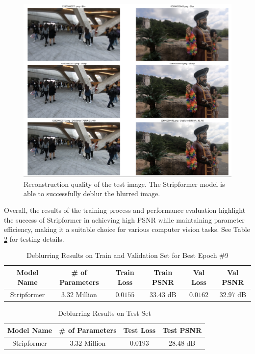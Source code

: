 \documentclass[12pt, a4paper, twoside]{article}
\begin{document}
			\begin{figure}[hbt!]
				\centering
				\includegraphics[width=\textwidth]{test1.png}
				\caption{Reconstruction quality of the test image. The Stripformer model is able to successfully deblur the blurred image.}
				\label{F:test}
			\end{figure}
			
			Overall, the results of the training process and performance evaluation highlight the success of Stripformer in achieving high PSNR while maintaining parameter efficiency, making it a suitable choice for various computer vision tasks. See Table \ref{T:test} for testing details.
			
			\begin{table}[hbt!]
				\begin{center}
					\begin{tabular}{c c c c c c}
						\hline
						\textbf{Model Name}& \textbf{\# of Parameters} & \textbf{Train Loss} & \textbf{Train PSNR} & \textbf{Val Loss} & \textbf{Val PSNR} \\ \hline
						Stripformer & $3.32$ Million & $0.0155$ & $33.43$ dB & $0.0162$ & $32.97$ dB \\ \hline
					\end{tabular}
					\caption{Deblurring Results on Train and Validation Set for Best Epoch \#9}\label{T:train}
				\end{center}
			\end{table}
			
			\begin{table}[hbt!]
				\begin{center}
						\begin{tabular}{c c c c}
								\hline
								\textbf{Model Name} & \textbf{\# of Parameters} & \textbf{Test Loss} & \textbf{Test PSNR} \\ \hline
								Stripformer & $3.32$ Million & $0.0193$ & $28.48$ dB \\ \hline
							\end{tabular}
						\caption{Deblurring Results on Test Set}\label{T:test}
					\end{center}
			\end{table}
			
\end{document}
